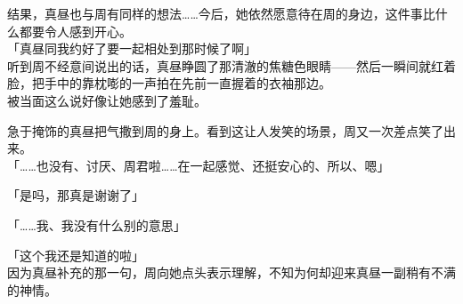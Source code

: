 结果，真昼也与周有同样的想法……今后，她依然愿意待在周的身边，这件事比什么都要令人感到开心。\\

「真昼同我约好了要一起相处到那时候了啊」\\

听到周不经意间说出的话，真昼睁圆了那清澈的焦糖色眼睛——然后一瞬间就红着脸，把手中的靠枕嘭的一声拍在先前一直握着的衣袖那边。\\

被当面这么说好像让她感到了羞耻。

急于掩饰的真昼把气撒到周的身上。看到这让人发笑的场景，周又一次差点笑了出来。\\

「……也没有、讨厌、周君啦……在一起感觉、还挺安心的、所以、嗯」

「是吗，那真是谢谢了」

「……我、我没有什么别的意思」

「这个我还是知道的啦」\\

因为真昼补充的那一句，周向她点头表示理解，不知为何却迎来真昼一副稍有不满的神情。
